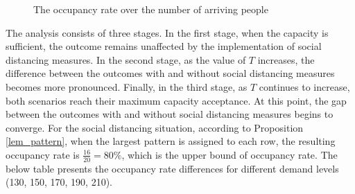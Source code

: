 \begin{figure}[h]
  \centering
  \caption{The occupancy rate over the number of arriving people}
  \label{Fig.lable}
\end{figure}

The analysis consists of three stages. 
In the first stage, when the capacity is sufficient, the outcome remains unaffected by the implementation of social distancing measures. In the second stage, as the value of $T$ increases, the difference between the outcomes with and without social distancing measures becomes more pronounced. Finally, in the third stage, as $T$ continues to increase, both scenarios reach their maximum capacity acceptance. At this point, the gap between the outcomes with and without social distancing measures begins to converge. For the social distancing situation, according to Proposition \ref{lem_pattern}, when the largest pattern is assigned to each row, the resulting occupancy rate is $\frac{16}{20} = 80\%$, which is the upper bound of occupancy rate. The below table presents the occupancy rate differences for different demand levels (130, 150, 170, 190, 210).



